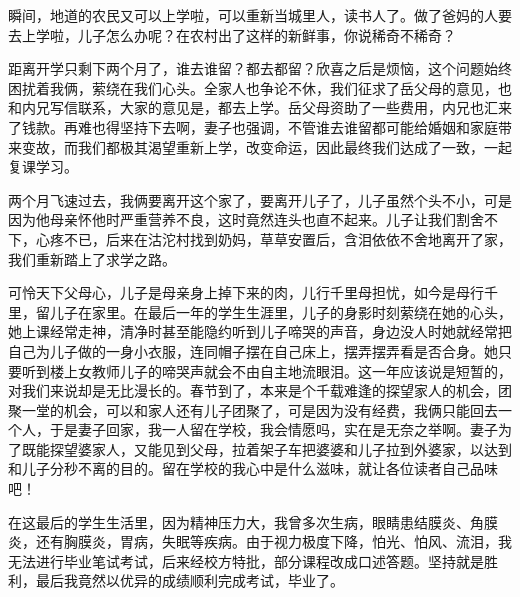瞬间，地道的农民又可以上学啦，可以重新当城里人，读书人了。做了爸妈的人要去上学啦，儿子怎么办呢？在农村出了这样的新鲜事，你说稀奇不稀奇？

距离开学只剩下两个月了，谁去谁留？都去都留？欣喜之后是烦恼，这个问题始终困扰着我俩，萦绕在我们心头。全家人也争论不休，我们征求了岳父母的意见，也和内兄写信联系，大家的意见是，都去上学。岳父母资助了一些费用，内兄也汇来了钱款。再难也得坚持下去啊，妻子也强调，不管谁去谁留都可能给婚姻和家庭带来变故，而我们都极其渴望重新上学，改变命运，因此最终我们达成了一致，一起复课学习。

两个月飞速过去，我俩要离开这个家了，要离开儿子了，儿子虽然个头不小，可是因为他母亲怀他时严重营养不良，这时竟然连头也直不起来。儿子让我们割舍不下，心疼不已，后来在沽沱村找到奶妈，草草安置后，含泪依依不舍地离开了家，我们重新踏上了求学之路。

可怜天下父母心，儿子是母亲身上掉下来的肉，儿行千里母担忧，如今是母行千里，留儿子在家里。在最后一年的学生生涯里，儿子的身影时刻萦绕在她的心头，她上课经常走神，清净时甚至能隐约听到儿子啼哭的声音，身边没人时她就经常把自己为儿子做的一身小衣服，连同帽子摆在自己床上，摆弄摆弄看是否合身。她只要听到楼上女教师儿子的啼哭声就会不由自主地流眼泪。这一年应该说是短暂的，对我们来说却是无比漫长的。春节到了，本来是个千载难逢的探望家人的机会，团聚一堂的机会，可以和家人还有儿子团聚了，可是因为没有经费，我俩只能回去一个人，于是妻子回家，我一人留在学校，我会情愿吗，实在是无奈之举啊。妻子为了既能探望婆家人，又能见到父母，拉着架子车把婆婆和儿子拉到外婆家，以达到和儿子分秒不离的目的。留在学校的我心中是什么滋味，就让各位读者自己品味吧！

在这最后的学生生活里，因为精神压力大，我曾多次生病，眼睛患结膜炎、角膜炎，还有胸膜炎，胃病，失眠等疾病。由于视力极度下降，怕光、怕风、流泪，我无法进行毕业笔试考试，后来经校方特批，部分课程改成口述答题。坚持就是胜利，最后我竟然以优异的成绩顺利完成考试，毕业了。

